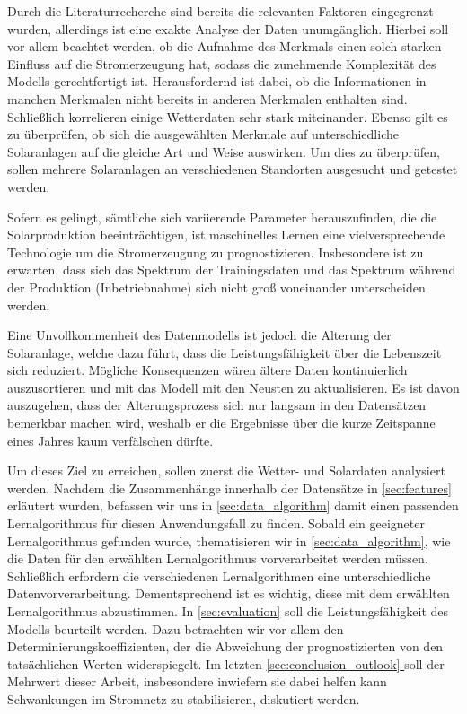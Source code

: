 \documentclass[12pt, a4paper]{article}
\newcommand*{\fullref}[1]{\hyperref[{#1}]{\autoref*{#1} \nameref*{#1}}}
\begin{document}
Durch die Literaturrecherche sind bereits die relevanten Faktoren eingegrenzt wurden, allerdings ist eine exakte Analyse der Daten unumgänglich. Hierbei soll vor allem beachtet werden, ob die Aufnahme des Merkmals einen solch starken Einfluss auf die Stromerzeugung hat, sodass die zunehmende Komplexität des Modells gerechtfertigt ist. Herausfordernd ist dabei, ob die Informationen in manchen Merkmalen nicht bereits in anderen Merkmalen enthalten sind. Schließlich korrelieren einige Wetterdaten sehr stark miteinander. Ebenso gilt es zu überprüfen, ob sich die ausgewählten Merkmale auf unterschiedliche Solaranlagen auf die gleiche Art und Weise auswirken. Um dies zu überprüfen, sollen mehrere Solaranlagen an verschiedenen Standorten ausgesucht und getestet werden.

Sofern es gelingt, sämtliche sich variierende Parameter herauszufinden, die die Solarproduktion beeinträchtigen, ist maschinelles Lernen eine vielversprechende Technologie um die Stromerzeugung zu prognostizieren. Insbesondere ist zu erwarten, dass sich das Spektrum der Trainingsdaten und das Spektrum während der Produktion (Inbetriebnahme) sich nicht groß voneinander unterscheiden werden.

Eine Unvollkommenheit des Datenmodells ist jedoch die Alterung der Solaranlage, welche dazu führt, dass die Leistungsfähigkeit über die Lebenszeit sich reduziert. Mögliche Konsequenzen wären ältere Daten kontinuierlich auszusortieren und mit das Modell mit den Neusten zu aktualisieren. Es ist davon auszugehen, dass der Alterungsprozess sich nur langsam in den Datensätzen bemerkbar machen wird, weshalb er die Ergebnisse über die kurze Zeitspanne eines Jahres kaum verfälschen dürfte.

Um dieses Ziel zu erreichen, sollen zuerst die Wetter- und Solardaten analysiert werden. Nachdem die Zusammenhänge innerhalb der Datensätze in \autoref{sec:features} erläutert wurden, befassen wir uns in \autoref{sec:data_algorithm} damit einen passenden Lernalgorithmus für diesen Anwendungsfall zu finden. Sobald ein geeigneter Lernalgorithmus gefunden wurde, thematisieren wir in \autoref{sec:data_algorithm}, wie die Daten für den erwählten Lernalgorithmus vorverarbeitet werden müssen. Schließlich erfordern die verschiedenen Lernalgorithmen eine unterschiedliche Datenvorverarbeitung. Dementsprechend ist es wichtig, diese mit dem erwählten Lernalgorithmus abzustimmen. In \autoref{sec:evaluation} soll die Leistungsfähigkeit des Modells beurteilt werden. Dazu betrachten wir vor allem den Determinierungskoeffizienten, der die Abweichung der prognostizierten von den tatsächlichen Werten widerspiegelt. Im letzten \fullref{sec:conclusion_outlook} soll der Mehrwert dieser Arbeit, insbesondere inwiefern sie dabei helfen kann Schwankungen im Stromnetz zu stabilisieren, diskutiert werden.
 
\end{document}
